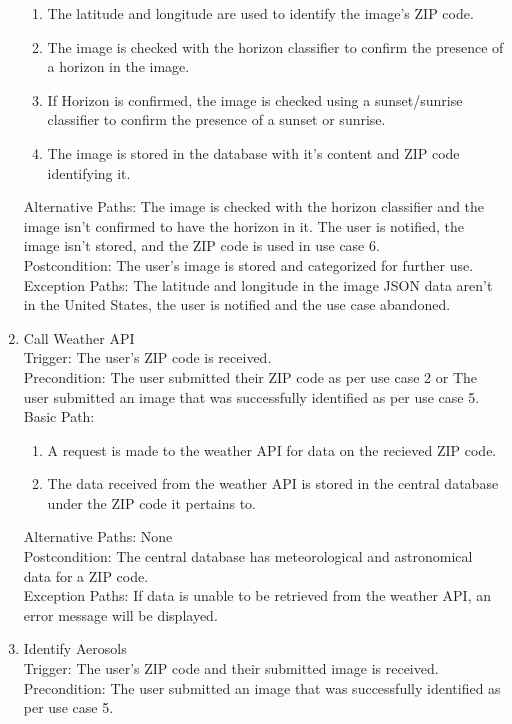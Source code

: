\documentclass[journal,10pt,draftclsnofoot,onecolumn]{IEEEtran}
\begin{document}
\begin{singlespace}
\begin{enumerate}
\begin{enumerate}
			\item The latitude and longitude are used to identify the image's ZIP code.
			\item The image is checked with the horizon classifier to confirm the presence of a horizon in the image.
			\item If Horizon is confirmed, the image is checked using a sunset/sunrise classifier to confirm the presence of a sunset or sunrise.
			\item The image is stored in the database with it's content and ZIP code identifying it.
		\end{enumerate}
		Alternative Paths: The image is checked with the horizon classifier and the image isn't confirmed to have the horizon in it. The user is notified, the image isn't stored, and the ZIP code is used in use case 6.\\
		Postcondition: The user's image is stored and categorized for further use.\\
		Exception Paths: The latitude and longitude in the image JSON data aren't in the United States, the user is notified and the use case abandoned.
	\\
	\item Call Weather API\\
		Trigger: The user's ZIP code is received.\\
		Precondition: The user submitted their ZIP code as per use case 2 or The user submitted an image that was successfully identified as per use case 5.\\
		Basic Path:
		\begin{enumerate}
			\item A request is made to the weather API for data on the recieved ZIP code.
			\item The data received from the weather API is stored in the central database under the ZIP code it pertains to.
		\end{enumerate}
		Alternative Paths: None\\
		Postcondition: The central database has meteorological and astronomical data for a ZIP code.\\
		Exception Paths: If data is unable to be retrieved from the weather API, an error message will be displayed.
	\\
	\item Identify Aerosols\\
		Trigger: The user's ZIP code and their submitted image is received.\\
		Precondition: The user submitted an image that was successfully identified as per use case 5.\\

\end{enumerate}
\end{singlespace}
\end{document}
